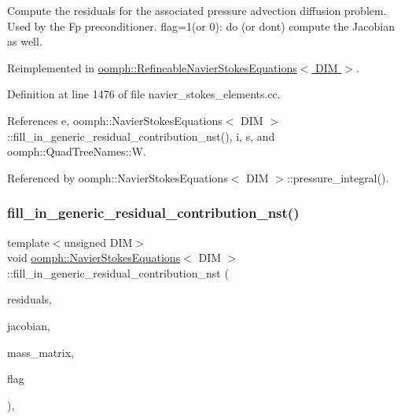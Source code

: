 Compute the residuals for the associated pressure advection diffusion problem. Used by the Fp preconditioner. flag=1(or 0)\+: do (or don\textquotesingle{}t) compute the Jacobian as well. 

Reimplemented in \hyperlink{classoomph_1_1RefineableNavierStokesEquations_aa5fb8ebc1a96ed6fc7733c5aaa238582}{oomph\+::\+Refineable\+Navier\+Stokes\+Equations$<$ D\+I\+M $>$}.



Definition at line 1476 of file navier\+\_\+stokes\+\_\+elements.\+cc.



References e, oomph\+::\+Navier\+Stokes\+Equations$<$ D\+I\+M $>$\+::fill\+\_\+in\+\_\+generic\+\_\+residual\+\_\+contribution\+\_\+nst(), i, s, and oomph\+::\+Quad\+Tree\+Names\+::W.



Referenced by oomph\+::\+Navier\+Stokes\+Equations$<$ D\+I\+M $>$\+::pressure\+\_\+integral().

\mbox{\label{classoomph_1_1NavierStokesEquations_acaa521c31b070b81f424e4eec4fed579}} 
\subsubsection{\texorpdfstring{fill\+\_\+in\+\_\+generic\+\_\+residual\+\_\+contribution\+\_\+nst()}{fill\_in\_generic\_residual\_contribution\_nst()}}
{\footnotesize\ttfamily template$<$unsigned D\+IM$>$ \\
void \hyperlink{classoomph_1_1NavierStokesEquations}{oomph\+::\+Navier\+Stokes\+Equations}$<$ D\+IM $>$\+::fill\+\_\+in\+\_\+generic\+\_\+residual\+\_\+contribution\+\_\+nst (\begin{DoxyParamCaption}\item[{\hyperlink{classoomph_1_1Vector}{Vector}$<$ double $>$ \&}]{residuals,  }\item[{\hyperlink{classoomph_1_1DenseMatrix}{Dense\+Matrix}$<$ double $>$ \&}]{jacobian,  }\item[{\hyperlink{classoomph_1_1DenseMatrix}{Dense\+Matrix}$<$ double $>$ \&}]{mass\+\_\+matrix,  }\item[{unsigned}]{flag }\end{DoxyParamCaption})\hspace{0.3cm}{\ttfamily [protected]}, {\ttfamily [virtual]}}



